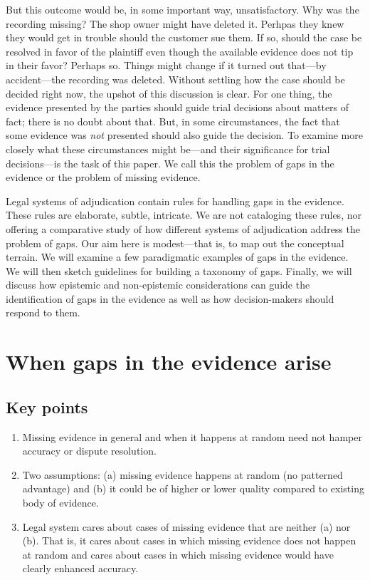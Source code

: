 \documentclass[
  10pt,
  dvipsnames,enabledeprecatedfontcommands]{scrartcl}
\begin{document}
But this outcome would be, in some important way, unsatisfactory. Why
was the recording missing? The shop owner might have deleted it. Perhpas
they knew they would get in trouble should the customer sue them. If so,
should the case be resolved in favor of the plaintiff even though the
available evidence does not tip in their favor? Perhaps so. Things might
change if it turned out that---by accident---the recording was deleted.
Without settling how the case should be decided right now, the upshot of
this discussion is clear. For one thing, the evidence presented by the
parties should guide trial decisions about matters of fact; there is no
doubt about that. But, in some circumstances, the fact that some
evidence was \textit{not} presented should also guide the decision. To
examine more closely what these circumstances might be---and their
significance for trial decisions---is the task of this paper. We call
this the problem of gaps in the evidence or the problem of missing
evidence.

Legal systems of adjudication contain rules for handling gaps in the
evidence. These rules are elaborate, subtle, intricate. We are not
cataloging these rules, nor offering a comparative study of how
different systems of adjudication address the problem of gaps. Our aim
here is modest---that is, to map out the conceptual terrain. We will
examine a few paradigmatic examples of gaps in the evidence. We will
then sketch guidelines for building a taxonomy of gaps. Finally, we will
discuss how epistemic and non-epistemic considerations can guide the
identification of gaps in the evidence as well as how decision-makers
should respond to them.

\hypertarget{when-gaps-in-the-evidence-arise}{%
\section{When gaps in the evidence
arise}\label{when-gaps-in-the-evidence-arise}}

\hypertarget{key-points}{%
\subsection{Key points}\label{key-points}}

\begin{enumerate}
\def\labelenumi{(\arabic{enumi})}
\item
  Missing evidence in general and when it happens at random need not
  hamper accuracy or dispute resolution.
\item
  Two assumptions: (a) missing evidence happens at random (no patterned
  advantage) and (b) it could be of higher or lower quality compared to
  existing body of evidence.
\item
  Legal system cares about cases of missing evidence that are neither
  (a) nor (b). That is, it cares about cases in which missing evidence
  does not happen at random and cares about cases in which missing
  evidence would have clearly enhanced accuracy.
\end{enumerate}
\end{document}
